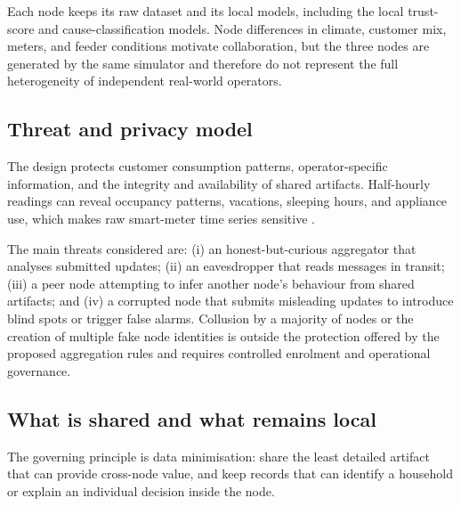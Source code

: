 Each node keeps its raw dataset and its local models, including the local trust-score and cause-classification models. Node differences in climate, customer mix, meters, and feeder conditions motivate collaboration, but the three nodes are generated by the same simulator and therefore do not represent the full heterogeneity of independent real-world operators.

\subsection{Threat and privacy model}
The design protects customer consumption patterns, operator-specific information, and the integrity and availability of shared artifacts. Half-hourly readings can reveal occupancy patterns, vacations, sleeping hours, and appliance use, which makes raw smart-meter time series sensitive \cite{hart1992}.

The main threats considered are: (i) an honest-but-curious aggregator that analyses submitted updates; (ii) an eavesdropper that reads messages in transit; (iii) a peer node attempting to infer another node's behaviour from shared artifacts; and (iv) a corrupted node that submits misleading updates to introduce blind spots or trigger false alarms. Collusion by a majority of nodes or the creation of multiple fake node identities is outside the protection offered by the proposed aggregation rules and requires controlled enrolment and operational governance.

\subsection{What is shared and what remains local}
The governing principle is data minimisation: share the least detailed artifact that can provide cross-node value, and keep records that can identify a household or explain an individual decision inside the node.

